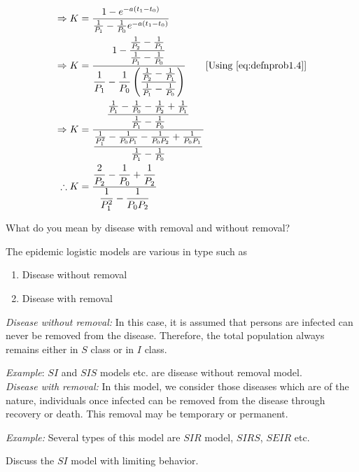 \documentclass[../main-sheet.tex]{subfiles}
\begin{document}
\begin{soln}
\begin{align*}
        \Rightarrow\; &K=\frac{ 1-e^{-a(t_1-t_0)}}{\frac{1}{P_1}-\frac{1}{P_0}e^{-a(t_1-t_0)}}\\
        \Rightarrow\; &K=\frac{\displaystyle 1-\frac{\frac{1}{P_2}-\frac{1}{P_1}}{\frac{1}{P_1}-\frac{1}{P_0}} }{\displaystyle \frac{1}{P_1}-\frac{1}{P_0}\left( \frac{\frac{1}{P_2}-\frac{1}{P_1}}{\frac{1}{P_1}-\frac{1}{P_0}} \right)}\qquad [\text{Using \eqref{eq:defnprob1.4}}]\\
        \Rightarrow\; &K=\frac{\displaystyle \frac{\frac{1}{P_1}-\frac{1}{P_0}-\frac{1}{P_2}+\frac{1}{P_1}}{\frac{1}{P_1}-\frac{1}{P_0}}}{\displaystyle \frac{\frac{1}{P_1^2}-\frac{1}{P_0P_1}-\frac{1}{P_0P_2}+\frac{1}{P_0P_1}}{\frac{1}{P_1}-\frac{1}{P_0}}}\\
        \therefore\; &K=\frac{\displaystyle \frac{2}{P_2}-\frac{1}{P_0}+\frac{1}{P_2}}{\displaystyle \frac{1}{P_1^2}-\frac{1}{P_0P_2}}
    \end{align*}
\end{soln}
\begin{prob}
    What do you mean by disease with removal and without removal?
\end{prob}
\begin{soln}
    The epidemic logistic models are various in type such as
    \begin{enumerate}[label=(\roman*)]
        \item Disease without removal
        \item Disease with removal
    \end{enumerate}
    \emph{Disease without removal:} In this case, it is assumed that persons are infected can never be removed from the disease. Therefore, the total population always remains either in \(S\) class or in \(I\) class.

    \emph{Example}: \(SI\) and \(SIS\) models etc. are disease without removal model.\\

    \emph{Disease with removal:} In this model, we consider those diseases which are of the nature, individuals once infected can be removed from the disease through recovery or death. This removal may be temporary or permanent.

    \emph{Example:} Several types of this model are \(SIR\) model, \(SIRS\), \(SEIR\) etc.
\end{soln}
\begin{prob}
    Discuss the \(SI\) model with limiting behavior.
\end{prob}
\end{document}
